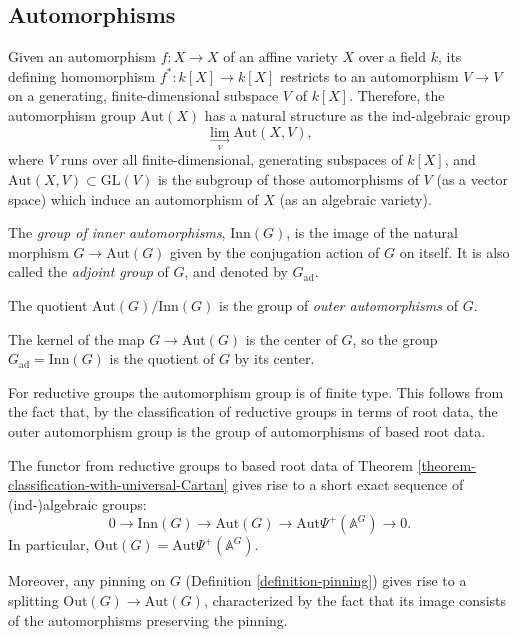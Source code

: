 \subsection{Automorphisms} 
\label{subsection-automorphisms}

Given an automorphism $f:X\to X$ of an affine variety $X$ over a field $k$, its defining homomorphism $f^*:k[X]\to k[X]$ restricts to an automorphism $V\to V$ on a generating, finite-dimensional subspace $V$ of $k[X]$. Therefore, the automorphism group $\text{Aut}(X)$ has a natural structure as the ind-algebraic group
$$ \underset{\underset{V}\to}\lim \text{Aut}(X,V),$$
where $V$ runs over all finite-dimensional, generating subspaces of $k[X]$, and $\text{Aut}(X,V)\subset \text{GL}(V)$ is the subgroup of those automorphisms of $V$ (as a vector space) which induce an automorphism of $X$ (as an algebraic variety).

\begin{definition}
 \label{definition-automorphism-group}
The {\it group of inner automorphisms}, $\text{Inn}(G)$, is the image of the natural morphism $G\to \text{Aut}(G)$ given by the conjugation action of $G$ on itself. It is also called the {\it adjoint group} of $G$, and denoted by $G_{\text{ad}}$. 

The quotient $\text{Aut}(G)/\text{Inn}(G)$ is the group of {\it outer automorphisms} of $G$.
\end{definition}

The kernel of the map $G\to \text{Aut}(G)$ is the center of $G$, so the group $G_{\text{ad}}=\text{Inn}(G)$ is the quotient of $G$ by its center.

For reductive groups the automorphism group is of finite type. This follows from the fact that, by the classification of reductive groups in terms of root data, the outer automorphism group is the group of automorphisms of based root data.

\begin{proposition}
 \label{proposition-automorphism-sequence}
The functor from reductive groups to based root data of Theorem \ref{theorem-classification-with-universal-Cartan} gives rise to a short exact sequence of (ind-)algebraic groups:
\begin{equation}
 \label{equation-Inn-Aut-Out}
0\to \text{Inn}(G)\to \text{Aut}(G)\to \text{Aut}\Psi^+(\mathbb A^G) \to 0.
\end{equation}
In particular, $\text{Out}(G)=\text{Aut}\Psi^+(\mathbb A^G) $. 

Moreover, any pinning on $G$ (Definition \ref{definition-pinning}) gives rise to a splitting $\text{Out}(G)\to \text{Aut}(G)$, characterized by the fact that its image consists of the automorphisms preserving the pinning.
\end{proposition}

